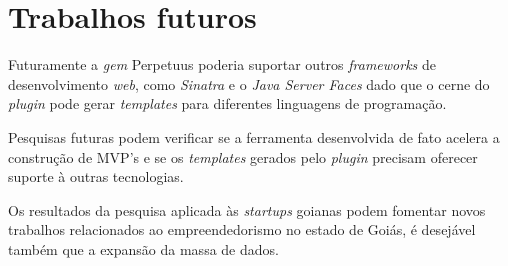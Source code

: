 \section{Trabalhos futuros}

Futuramente a \emph{gem} Perpetuus poderia suportar outros \emph{frameworks} de desenvolvimento \emph{web}, como \emph{Sinatra} e o \emph{Java Server Faces} dado que o cerne do \emph{plugin} pode gerar \emph{templates} para diferentes linguagens de programa\c{c}\~ao.

Pesquisas futuras podem verificar se a ferramenta desenvolvida de fato acelera a constru\c{c}\~ao de MVP's e se os \emph{templates} gerados pelo \emph{plugin} precisam oferecer suporte \`a outras tecnologias.

Os resultados da pesquisa aplicada \`as \emph{startups} goianas podem fomentar novos trabalhos relacionados ao empreendedorismo no estado de Goi\'as, \'e desej\'avel tamb\'em que a expans\~ao da massa de dados.